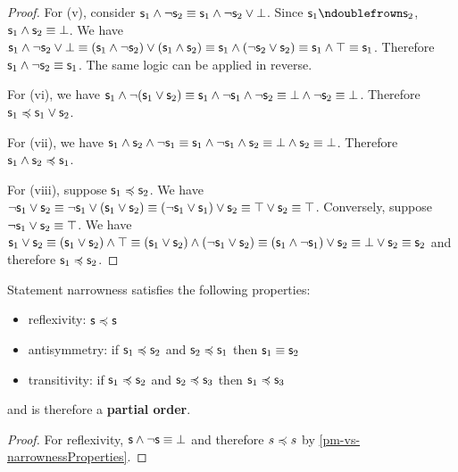 \begin{mathSection}
\begin{proof}
			For (v), consider $\mathsf{s}_1 \wedge \neg \mathsf{s}_2 \equiv \mathsf{s}_1 \wedge \neg \mathsf{s}_2 \vee \bot$. Since $\stmt_1 \ncomp \stmt_2$, $\mathsf{s}_1 \wedge \mathsf{s}_2 \equiv \bot$. We have $\mathsf{s}_1 \wedge \neg \mathsf{s}_2 \vee \bot \equiv ( \mathsf{s}_1 \wedge \neg \mathsf{s}_2 ) \vee (\mathsf{s}_1 \wedge \mathsf{s}_2) \equiv \mathsf{s}_1 \wedge (\neg \mathsf{s}_2 \vee \mathsf{s}_2) \equiv \mathsf{s}_1 \wedge \top \equiv \mathsf{s}_1$. Therefore $\mathsf{s}_1 \wedge \neg \mathsf{s}_2 \equiv \mathsf{s}_1$. The same logic can be applied in reverse.
			
			For (vi), we have $\mathsf{s}_1 \wedge \neg (\mathsf{s}_1 \vee \mathsf{s}_2) \equiv \mathsf{s}_1 \wedge \neg \mathsf{s}_1 \wedge \neg \mathsf{s}_2 \equiv \bot \wedge \neg \mathsf{s}_2 \equiv \bot$. Therefore $\mathsf{s}_1 \preccurlyeq \mathsf{s}_1 \vee \mathsf{s}_2$.
			
			For (vii), we have $\mathsf{s}_1 \wedge \mathsf{s}_2 \wedge \neg \mathsf{s}_1 \equiv \mathsf{s}_1 \wedge \neg \mathsf{s}_1 \wedge \mathsf{s}_2 \equiv \bot \wedge \mathsf{s}_2 \equiv \bot$. Therefore $\mathsf{s}_1 \wedge \mathsf{s}_2 \preccurlyeq \mathsf{s}_1$.
			
			For (viii), suppose $\mathsf{s}_1 \preccurlyeq \mathsf{s}_2$. We have $\neg \mathsf{s}_1 \vee \mathsf{s}_2 \equiv \neg \mathsf{s}_1 \vee ( \mathsf{s}_1 \vee \mathsf{s}_2 ) \equiv (\neg \mathsf{s}_1 \vee \mathsf{s}_1) \vee \mathsf{s}_2 \equiv \top \vee \mathsf{s}_2 \equiv \top$. Conversely, suppose $\neg \mathsf{s}_1 \vee \mathsf{s}_2 \equiv \top$. We have $\mathsf{s}_1 \vee \mathsf{s}_2 \equiv (\mathsf{s}_1 \vee \mathsf{s}_2) \wedge \top \equiv (\mathsf{s}_1 \vee \mathsf{s}_2) \wedge (\neg \mathsf{s}_1 \vee \mathsf{s}_2) \equiv (\mathsf{s}_1 \wedge \neg \mathsf{s}_1) \vee \mathsf{s}_2 \equiv \bot \vee \mathsf{s}_2 \equiv \mathsf{s}_2$ and therefore $\mathsf{s}_1 \preccurlyeq \mathsf{s}_2$.
		\end{proof}
		
		\begin{prop}
			Statement narrowness satisfies the following properties:
			\begin{itemize}
				\item reflexivity: $\mathsf{s} \preccurlyeq \mathsf{s}$
				\item antisymmetry: if $\mathsf{s}_1 \preccurlyeq \mathsf{s}_2$ and  $\mathsf{s}_2 \preccurlyeq \mathsf{s}_1$ then $\mathsf{s}_1 \equiv \mathsf{s}_2$
				\item transitivity: if $\mathsf{s}_1 \preccurlyeq \mathsf{s}_2$ and $\mathsf{s}_2 \preccurlyeq \mathsf{s}_3$ then $\mathsf{s}_1 \preccurlyeq \mathsf{s}_3$
			\end{itemize}
			and is therefore a \textbf{partial order}.
		\end{prop}
		\begin{proof}
			For reflexivity, $\mathsf{s} \wedge \neg \mathsf{s} \equiv \bot$ and therefore $s \preccurlyeq s$ by \ref{pm-vs-narrownessProperties}.
			

\end{proof}
\end{mathSection}
